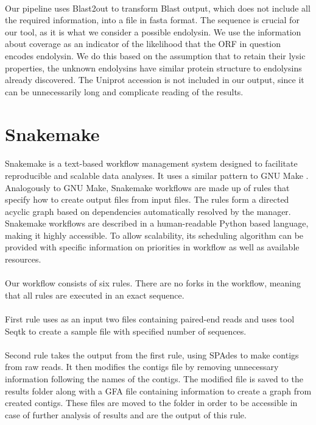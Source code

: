 \paragraph*{}
Our pipeline uses Blast2out to transform Blast output, which does not include all the required information, into a file in fasta format. The sequence is crucial for our tool, as it is what we consider a possible endolysin. We use the information about coverage as an indicator of the likelihood that the ORF in question encodes endolysin. We do this based on the assumption that to retain their lysic properties, the unknown endolysins have similar protein structure to endolysins already discovered. The Uniprot accession is not included in our output, since it can be unnecessarily long and complicate reading of the results.

\section{Snakemake}
\paragraph*{}
Snakemake\cite{koster2012snakemake} is a text-based workflow management system designed to facilitate reproducible and scalable data analyses. It uses a similar pattern to GNU Make \cite{stallman1991gnu}. Analogously to GNU Make, Snakemake workflows are made up of rules that specify how to create output files from input files. The rules form a directed acyclic graph based on dependencies automatically resolved by the manager. Snakemake workflows are described in a human-readable Python based language, making it highly accessible. To allow scalability, its scheduling algorithm can be provided with specific information on priorities in workflow as well as available resources.
\paragraph*{}
Our workflow consists of six rules. There are no forks in the workflow, meaning that all rules are executed in an exact sequence.
\paragraph*{}
First rule uses as an input two files containing paired-end reads and uses tool Seqtk to create a sample file with specified number of sequences.
\paragraph*{}
Second rule takes the output from the first rule, using SPAdes to make contigs from raw reads. It then modifies the contigs file by removing unnecessary information following the names of the contigs. The modified file is saved to the results folder along with a GFA file containing information to create a graph from created contigs. These files are moved to the folder in order to be accessible in case of further analysis of results and are the output of this rule.
